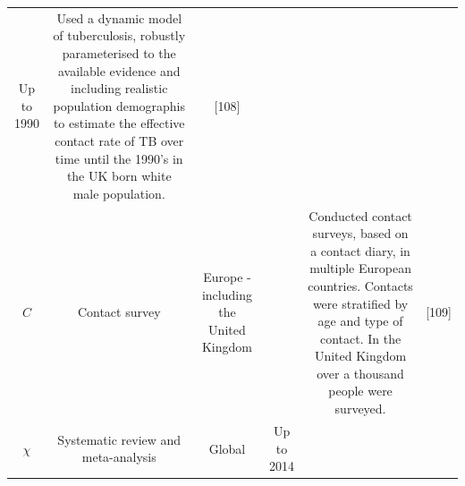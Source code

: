 \documentclass[11pt,twoside]{bristolthesis}
\begin{document}
\begin{longtable}[]{@{}cccccc@{}}
\begin{minipage}[t]{0.07\columnwidth}
  Up to
  1990\strut
  \end{minipage} & \begin{minipage}[t]{0.27\columnwidth}\centering
  Used a dynamic model of tuberculosis,
  robustly parameterised to the available
  evidence and including realistic
  population demographis to estimate the
  effective contact rate of TB over time
  until the 1990's in the UK born white
  male population.\strut
  \end{minipage} & \begin{minipage}[t]{0.11\columnwidth}\centering
  {[}108{]}\strut
  \end{minipage}\tabularnewline
  \begin{minipage}[t]{0.21\columnwidth}\centering
  \(C\)\strut
  \end{minipage} & \begin{minipage}[t]{0.10\columnwidth}\centering
  Contact
  survey\strut
  \end{minipage} & \begin{minipage}[t]{0.07\columnwidth}\centering
  Europe -
  including
  the
  United
  Kingdom\strut
  \end{minipage} & \begin{minipage}[t]{0.07\columnwidth}\centering
  2005\strut
  \end{minipage} & \begin{minipage}[t]{0.27\columnwidth}\centering
  Conducted contact surveys, based on a
  contact diary, in multiple European
  countries. Contacts were stratified by
  age and type of contact. In the United
  Kingdom over a thousand people were
  surveyed.\strut
  \end{minipage} & \begin{minipage}[t]{0.11\columnwidth}\centering
  {[}109{]}\strut
  \end{minipage}\tabularnewline
  \begin{minipage}[t]{0.21\columnwidth}\centering
  \(\chi\)\strut
  \end{minipage} & \begin{minipage}[t]{0.10\columnwidth}\centering
  Systematic
  review and
  meta-analysis\strut
  \end{minipage} & \begin{minipage}[t]{0.07\columnwidth}\centering
  Global\strut
  \end{minipage} & \begin{minipage}[t]{0.07\columnwidth}\centering
  Up to
  2014\strut
  \end{minipage} & \begin{minipage}[t]{0.27\columnwidth}\centering

\end{minipage}
\end{longtable}
\end{document}
